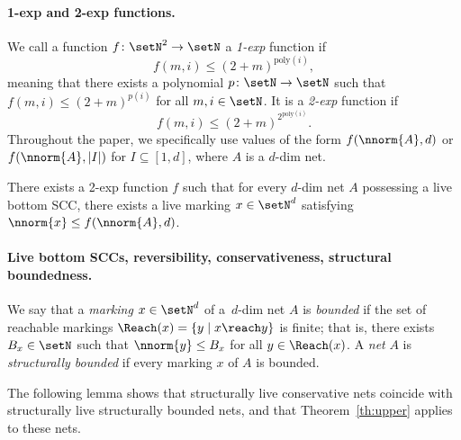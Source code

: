 \paragraph{1-exp and 2-exp functions.}
We call a function $f\colon\setN^2\to\setN$ 
a \emph{1-exp} function if 
\[f(m,i)\leq (2+m)^{\text{poly}(i)},\]
meaning that there exists a polynomial $p\colon\setN\to\setN$
such that 
$f(m,i)\leq (2+m)^{p(i)}$ for all $m,i\in\setN$.
It is a \emph{2-exp} function if 
\[f(m,i)\leq (2+m)^{2^{\text{poly}(i)}}.\]
Throughout the paper, we specifically use values of the form $f(\nnorm{A},d)$ or 
$f(\nnorm{A},|I|)$ for $I\subseteq[1,d]$, where $A$ is a $d$-dim net.

\begin{thm}\label{th:upper}
	There exists a 2-exp function $f$ such that 
	for every $d$-dim net $A$ possessing a live bottom SCC, 
	there exists a live marking
	$x\in\setN^d$
	satisfying $\nnorm{x}\leq f(\nnorm{A},d)$.
\end{thm}

\paragraph{Live bottom SCCs, reversibility, conservativeness,
	structural boundedness.}
 We say that a \emph{marking} $x\in\setN^d$ of a~$d$-dim net $A$ is
 \emph{bounded} if the set of reachable markings $\Reach(x)=\{y\mid
 x\reach y\}$ is finite; that is, 
 there exists $B_x\in\setN$ such that $\nnorm{y}\leq B_x$ for
 all $y\in\Reach(x)$. A \emph{net} $A$ is \emph{structurally
 bounded} if every marking $x$ of $A$ is bounded.

The following lemma shows that structurally live conservative nets coincide
	with structurally live structurally bounded nets, and that 
	Theorem~\ref{th:upper} applies to these nets.

